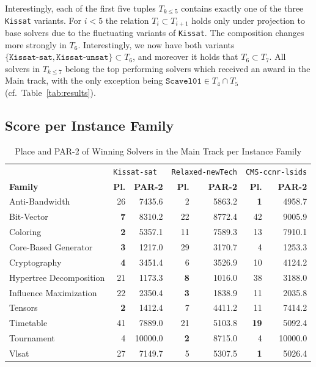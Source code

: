 \documentclass{elsarticle}
\newcommand{\solver}[1]{\texttt{#1}}
\begin{document}
Interestingly, each of the first five tuples $T_{k \leq 5}$ contains exactly one of the three \solver{Kissat} variants. 
For $i < 5$ the relation $T_{i} \subset T_{i+1}$ holds only under projection to base solvers due to the fluctuating variants of \solver{Kissat}. 
The composition changes more strongly in $T_6$. 
Interestingly, we now have both variants $\{ \solver{Kissat-sat}, \solver{Kissat-unsat} \} \subset T_6$, and moreover it holds that $T_6 \subset T_7$.
All solvers in $T_{k \leq 7}$ belong the top performing solvers which received an award in the Main track, with the only exception being $\solver{Scavel01} \in T_4 \cap T_5$ (cf.~Table~\ref{tab:results}). 


\subsection{Score per Instance Family} 

\begin{table}[b]
\small
\begin{tabularx}{\linewidth}{X|rrrrrr}
 & \multicolumn{2}{l}{\solver{Kissat-sat}} & \multicolumn{2}{l}{\solver{Relaxed-newTech}} & \multicolumn{2}{l}{\solver{CMS-ccnr-lsids}} \\
\bf Family & \bf Pl. & \bf PAR-2 & \bf Pl. & \bf PAR-2 & \bf Pl. & \bf PAR-2 \\
\hline
Anti-Bandwidth 			& 26 & 7435.6 &  2 & 5863.2 &  \bf 1 & 4958.7\\
Bit-Vector 				&  \bf 7 & 8310.2 & 22 & 8772.4 & 42 & 9005.9\\
Coloring 				&  \bf 2 & 5357.1 & 11 & 7589.3 & 13 & 7910.1\\
Core-Based Generator 	&  \bf 3 & 1217.0 & 29 & 3170.7 &  4 & 1253.3\\
Cryptography 			&  \bf 4 & 3451.4 &  6 & 3526.9 & 10 & 4124.2\\
Hypertree Decomposition & 21 & 1173.3 &  \bf 8 & 1016.0 & 38 & 3188.0\\
Influence Maximization 	& 22 & 2350.4 &  \bf 3 & 1838.9 & 11 & 2035.8\\
Tensors 				&  \bf 2 & 1412.4 &  7 & 4411.2 & 11 & 7414.2\\
Timetable 				& 41 & 7889.0 & 21 & 5103.8 & \bf 19 & 5092.4\\
Tournament 				& 4 & 10000.0&  \bf 2 & 8715.0 &  4 & 10000.0\\
Vlsat 					& 27 & 7149.7 &  5 & 5307.5 &  \bf 1 & 5026.4\\
\end{tabularx}
\caption{Place and PAR-2 of Winning Solvers in the Main Track per Instance Family}
\label{tab:eval-by-family}
\end{table}
\end{document}
